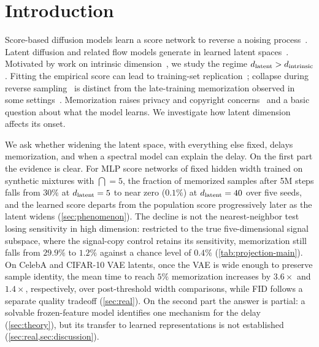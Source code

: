 \section{Introduction}
\label{sec:intro}

Score-based diffusion models learn a score network to reverse a noising process~\citep{ho2020denoising,song2021scoresde,karras2022elucidating}. Latent diffusion and related flow models generate in learned latent spaces~\citep{rombach2022highresolution,esser2024sd3}. Motivated by work on intrinsic dimension~\citep{stanczuk2024manifold,kamkari2024geometric}, we study the regime $d_{\mathrm{latent}}>d_{\mathrm{intrinsic}}$. Fitting the empirical score can lead to training-set replication~\citep{yi2023generalization}; collapse during reverse sampling~\citep{biroli2024dynamical} is distinct from the late-training memorization observed in some settings~\citep{bonnaire2025}. Memorization raises privacy and copyright concerns~\citep{carlini2019secret,somepalli2023diffusion,carlini2023extracting} and a basic question about what the model learns. We investigate how latent dimension affects its onset.

We ask whether widening the latent space, with everything else fixed, delays memorization, and when a spectral model can explain the delay. On the first part the evidence is clear. For MLP score networks of fixed hidden width trained on synthetic mixtures with $\dint=5$, the fraction of memorized samples after 5M steps falls from $30\%$ at $d_{\mathrm{latent}}=5$ to near zero ($0.1\%$) at $d_{\mathrm{latent}}=40$ over five seeds, and the learned score departs from the population score progressively later as the latent widens (\cref{sec:phenomenon}). The decline is not the nearest-neighbor test losing sensitivity in high dimension: restricted to the true five-dimensional signal subspace, where the signal-copy control retains its sensitivity, memorization still falls from $29.9\%$ to $1.2\%$ against a chance level of $0.4\%$ (\cref{tab:projection-main}). On CelebA and CIFAR-10 VAE latents, once the VAE is wide enough to preserve sample identity, the mean time to reach $5\%$ memorization increases by $3.6\times$ and $1.4\times$, respectively, over post-threshold width comparisons, while FID follows a separate quality tradeoff (\cref{sec:real}). On the second part the answer is partial: a solvable frozen-feature model identifies one mechanism for the delay (\cref{sec:theory}), but its transfer to learned representations is not established (\cref{sec:real,sec:discussion}).

